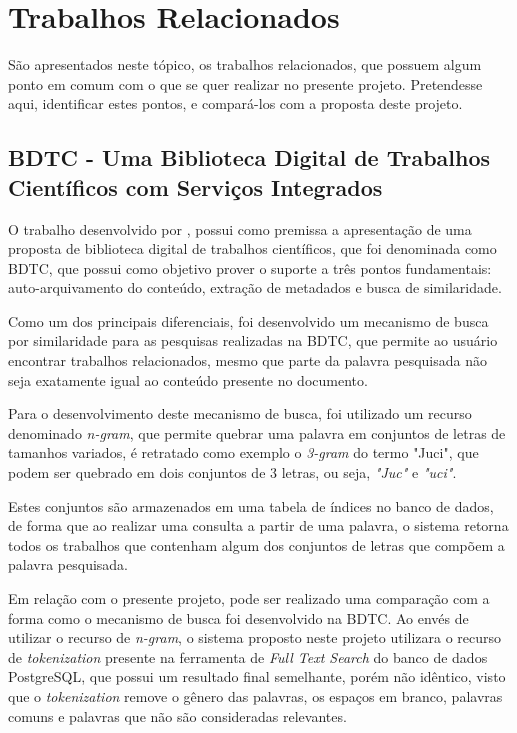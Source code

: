 \section{Trabalhos Relacionados}\label{sec:rw}

São apresentados neste tópico, os trabalhos relacionados, que possuem
algum ponto em comum com o que se quer realizar no presente projeto.
Pretendesse aqui, identificar estes pontos, e compará-los com a proposta deste projeto.

\subsection{BDTC - Uma Biblioteca Digital de Trabalhos Científicos com Serviços Integrados}

O trabalho desenvolvido por \cite{2009:Cervi}, possui como premissa a apresentação
de uma proposta de biblioteca digital de trabalhos científicos, que foi denominada como
BDTC, que possui como objetivo prover o suporte a três pontos fundamentais:
auto-arquivamento do conteúdo, extração de metadados e busca de similaridade.

Como um dos principais diferenciais, foi desenvolvido um mecanismo de
busca por similaridade para as pesquisas realizadas na BDTC,
que permite ao usuário encontrar trabalhos relacionados, mesmo que
parte da palavra pesquisada não seja exatamente igual ao conteúdo presente
no documento.

Para o desenvolvimento deste mecanismo de busca, foi utilizado
um recurso denominado \emph{n-gram}, que permite quebrar uma palavra em
conjuntos de letras de tamanhos variados, é retratado como exemplo o
\emph{3-gram} do termo "Juci", que podem ser quebrado em dois conjuntos de 3
letras, ou seja, \emph{"Juc"} e \emph{"uci"}.

Estes conjuntos são armazenados em uma tabela de índices no banco de
dados, de forma que ao realizar uma consulta a partir de uma palavra,
o sistema retorna todos os trabalhos que contenham algum dos conjuntos
de letras que compõem a palavra pesquisada.

Em relação com o presente projeto, pode ser realizado uma comparação com
a forma como o mecanismo de busca foi desenvolvido na BDTC. Ao envés de
utilizar o recurso de \emph{n-gram}, o sistema proposto neste projeto utilizara
o recurso de \emph{tokenization} presente na ferramenta de \emph{Full Text Search} do
banco de dados PostgreSQL, que possui um resultado final semelhante, porém não
idêntico, visto que o \emph{tokenization} remove o gênero das palavras,
os espaços em branco, palavras comuns e palavras que não são consideradas relevantes.

